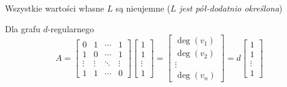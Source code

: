 \begin{fact}
Wszystkie wartości własne $L$ są nieujemne (\textit{$L$ jest pół-dodatnio określona})
\end{fact}

Dla grafu $d$-regularnego
$$A=\begin{bmatrix}
0&1&\cdots &1\\
1&0&\cdots &1\\
\vdots &\vdots & \ddots & \vdots \\
1&1&\cdots & 0
\end{bmatrix}\begin{bmatrix}
1\\1\\\vdots \\ 1
\end{bmatrix}=\begin{bmatrix}
\deg (v_1) \\\deg (v_2) \\\vdots \\\deg (v_n)
\end{bmatrix}=d\begin{bmatrix}
1\\1\\\vdots \\ 1
\end{bmatrix}$$


